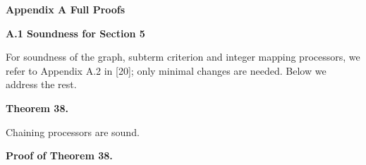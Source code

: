  


 
\par\medskip\noindent\textbf{Appendix A Full Proofs}\par
 
 
\par\medskip\noindent\textbf{A.1 Soundness for Section 5}\par
 
 
For soundness of the graph, subterm criterion and integer mapping processors, we refer to Appendix A.2 in [20]; only minimal changes are needed. Below we address the rest.\par
 
 
 
\par\medskip\noindent\textbf{Theorem 38.}\par
 
 
Chaining processors are sound.\par
 
 
 
 
\par\medskip\noindent\textbf{Proof of Theorem 38.}\par
 
 
